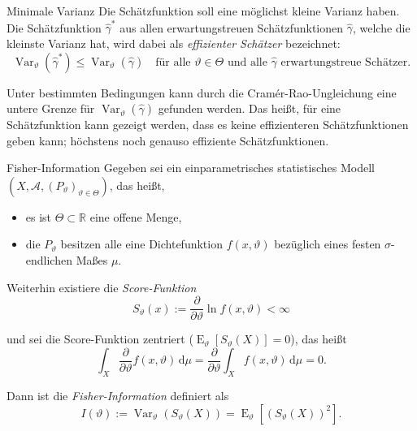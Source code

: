 \begin{bonus}[Schätzfunktion]{Minimale Varianz}
    Die Schätzfunktion soll eine möglichst kleine Varianz haben.
    Die Schätzfunktion $\hat{\gamma}^*$ aus allen erwartungstreuen Schätzfunktionen $\hat{\gamma}$, welche die kleinste Varianz hat, wird dabei als \emph{effizienter Schätzer} bezeichnet:
    \[
        \operatorname{Var}_{\vartheta}(\hat{\gamma}^*) \leq \operatorname{Var}_{\vartheta}(\hat{\gamma}) \quad \text{für alle } \vartheta \in \Theta \text{ und alle } \hat{\gamma} \text{ erwartungstreue Schätzer}.
    \]

    Unter bestimmten Bedingungen kann durch die Cramér-Rao-Ungleichung eine untere Grenze für $\operatorname{Var}_{\vartheta}(\hat{\gamma})$ gefunden werden.
    Das heißt, für eine Schätzfunktion kann gezeigt werden, dass es keine effizienteren Schätzfunktionen geben kann; höchstens noch genauso effiziente Schätzfunktionen.
\end{bonus}

\begin{defi}{Fisher-Information}
    Gegeben sei ein einparametrisches statistisches Modell $(X, \mathcal{A},(P_{\vartheta})_{\vartheta \in \Theta})$, das heißt,
    \begin{itemize}
        \item es ist $\Theta \subset \mathbb{R}$ eine offene Menge,
        \item die $P_{\vartheta}$ besitzen alle eine Dichtefunktion $f(x, \vartheta)$ bezüglich eines festen $\sigma$-endlichen Maßes $\mu$.
    \end{itemize}

    Weiterhin existiere die \emph{Score-Funktion}
    \[
        S_{\vartheta}(x) := \frac{\partial}{\partial \vartheta} \ln f(x, \vartheta) < \infty
    \]

    und sei die Score-Funktion zentriert ($\operatorname{E}_{\vartheta}[S_{\vartheta}(X)] = 0$), das heißt
    \[
        \int_{X} \frac{\partial}{\partial \vartheta} f(x, \vartheta) \, \mathrm{d} \mu = \frac{\partial}{\partial \vartheta} \int_{X} f(x, \vartheta) \, \mathrm{d} \mu = 0.
    \]

    Dann ist die \emph{Fisher-Information} definiert als
    \[
        I(\vartheta) := \operatorname{Var}_{\vartheta}(S_{\vartheta}(X)) = \operatorname{E}_{\vartheta}[(S_{\vartheta}(X))^2].
    \]
\end{defi}

